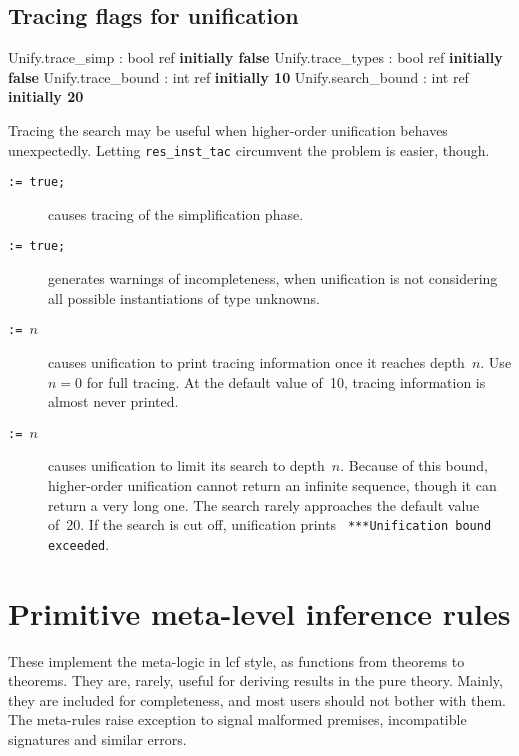 \subsection{Tracing flags for unification}
\begin{ttbox} 
Unify.trace_simp   : bool ref \hfill{\bf initially false}
Unify.trace_types  : bool ref \hfill{\bf initially false}
Unify.trace_bound  : int ref \hfill{\bf initially 10}
Unify.search_bound : int ref \hfill{\bf initially 20}
\end{ttbox}
Tracing the search may be useful when higher-order unification behaves
unexpectedly.  Letting {\tt res_inst_tac} circumvent the problem is easier,
though.
\begin{description}
\item[ \tt:= true;] 
causes tracing of the simplification phase.

\item[ \tt:= true;] 
generates warnings of incompleteness, when unification is not considering
all possible instantiations of type unknowns.

\item[ \tt:= $n$] 
causes unification to print tracing information once it reaches depth~$n$.
Use $n=0$ for full tracing.  At the default value of~10, tracing
information is almost never printed.

\item[ \tt:= $n$] 
causes unification to limit its search to depth~$n$.  Because of this
bound, higher-order unification cannot return an infinite sequence, though
it can return a very long one.  The search rarely approaches the default
value of~20.  If the search is cut off, unification prints {\tt
***Unification bound exceeded}.
\end{description}


\section{Primitive meta-level inference rules}
These implement the meta-logic in {\sc lcf} style, as functions from theorems
to theorems.  They are, rarely, useful for deriving results in the pure
theory.  Mainly, they are included for completeness, and most users should
not bother with them.  The meta-rules raise exception  to signal
malformed premises, incompatible signatures and similar errors.

